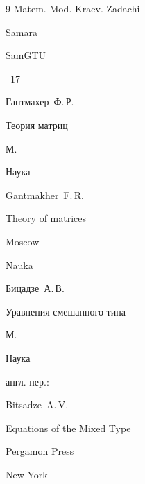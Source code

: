 \begin{thebibliography}{9}
\serial Matem. Mod. Kraev. Zadachi

\publaddr Samara

\publ SamGTU


--17








\by Гантмахер~Ф.\,Р.

\book Теория матриц

\publaddr М.

\publ Наука



\misctransl

\by Gantmakher~F.\,R.

\book Theory of matrices

\publaddr Moscow

\publ Nauka









\by Бицадзе~А.\,В.

\book Уравнения смешанного типа

\publaddr М.

\publ Наука



\transl англ. пер.:{} {} 

\by Bitsadze~A.\,V.

\book Equations of the Mixed Type 

\publ Pergamon Press

\publaddr New York









\end{thebibliography}



\noindent

\hskip6.5cm \thedate \par\noindent

\hskip6.5cm\therevdate






